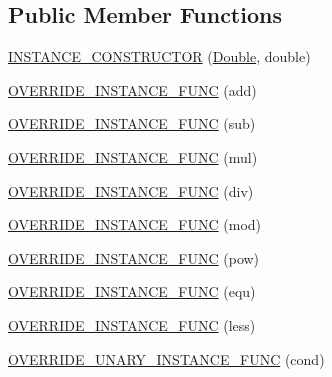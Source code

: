 \subsection*{Public Member Functions}
\begin{DoxyCompactItemize}
\item 
\mbox{\hyperlink{class_erable_1_1_erable_1_1_types_1_1_double_a741d7bd9011b4041431e87f10ed25c7c}{I\+N\+S\+T\+A\+N\+C\+E\+\_\+\+C\+O\+N\+S\+T\+R\+U\+C\+T\+OR}} (\mbox{\hyperlink{class_erable_1_1_erable_1_1_types_1_1_double}{Double}}, double)
\item 
\mbox{\hyperlink{class_erable_1_1_erable_1_1_types_1_1_double_a6a7f810740a1bc943e03ae230d9474c7}{O\+V\+E\+R\+R\+I\+D\+E\+\_\+\+I\+N\+S\+T\+A\+N\+C\+E\+\_\+\+F\+U\+NC}} (add)
\item 
\mbox{\hyperlink{class_erable_1_1_erable_1_1_types_1_1_double_ad6ff643912ed33b70468f0dbd6b7c713}{O\+V\+E\+R\+R\+I\+D\+E\+\_\+\+I\+N\+S\+T\+A\+N\+C\+E\+\_\+\+F\+U\+NC}} (sub)
\item 
\mbox{\hyperlink{class_erable_1_1_erable_1_1_types_1_1_double_a30e202dbc2a53655431f81518f0e4851}{O\+V\+E\+R\+R\+I\+D\+E\+\_\+\+I\+N\+S\+T\+A\+N\+C\+E\+\_\+\+F\+U\+NC}} (mul)
\item 
\mbox{\hyperlink{class_erable_1_1_erable_1_1_types_1_1_double_aaa5e338267919eca7db6d98766829b29}{O\+V\+E\+R\+R\+I\+D\+E\+\_\+\+I\+N\+S\+T\+A\+N\+C\+E\+\_\+\+F\+U\+NC}} (div)
\item 
\mbox{\hyperlink{class_erable_1_1_erable_1_1_types_1_1_double_af52ef9cba6f706f53c6f727a84d22a55}{O\+V\+E\+R\+R\+I\+D\+E\+\_\+\+I\+N\+S\+T\+A\+N\+C\+E\+\_\+\+F\+U\+NC}} (mod)
\item 
\mbox{\hyperlink{class_erable_1_1_erable_1_1_types_1_1_double_a53d3b0f9bc8647a30b890b97b40ef3a4}{O\+V\+E\+R\+R\+I\+D\+E\+\_\+\+I\+N\+S\+T\+A\+N\+C\+E\+\_\+\+F\+U\+NC}} (pow)
\item 
\mbox{\hyperlink{class_erable_1_1_erable_1_1_types_1_1_double_ad96c524475721d07b64dbab281e1142e}{O\+V\+E\+R\+R\+I\+D\+E\+\_\+\+I\+N\+S\+T\+A\+N\+C\+E\+\_\+\+F\+U\+NC}} (equ)
\item 
\mbox{\hyperlink{class_erable_1_1_erable_1_1_types_1_1_double_aae4055e0ef8da7d3f7ec1838081fa7e0}{O\+V\+E\+R\+R\+I\+D\+E\+\_\+\+I\+N\+S\+T\+A\+N\+C\+E\+\_\+\+F\+U\+NC}} (less)
\item 
\mbox{\hyperlink{class_erable_1_1_erable_1_1_types_1_1_double_a4d01f6eb71d7a9ffeb174223f15d59d3}{O\+V\+E\+R\+R\+I\+D\+E\+\_\+\+U\+N\+A\+R\+Y\+\_\+\+I\+N\+S\+T\+A\+N\+C\+E\+\_\+\+F\+U\+NC}} (cond)
\end{DoxyCompactItemize}
